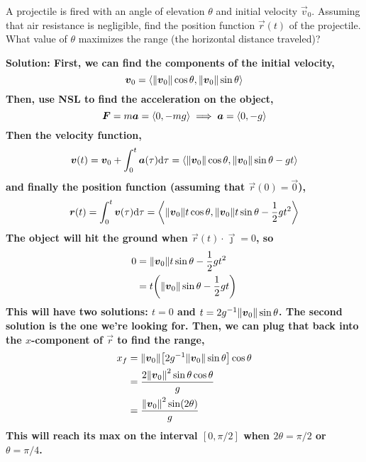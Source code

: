 \begin{example}
    A projectile is fired with an angle of elevation \(\theta\) and initial velocity \(\vec v_0\). Assuming that air resistance is negligible, find the position function \(\vec r(t)\) of the projectile. What value of \(\theta\) maximizes the range (the horizontal distance traveled)?\par\bf{Solution: } First, we can find the components of the initial velocity, \[ \boldsymbol{v}_0 = \left\langle\norm{\boldsymbol{v}_0}\cos \theta, \norm{\boldsymbol{v}_0}\sin \theta \right\rangle \] Then, use NSL to find the acceleration on the object,
    \[ \boldsymbol{F} = m\boldsymbol{a} = \left\langle0, -mg\right\rangle \implies \boldsymbol{a} = \left\langle0, -g\right\rangle \]
    Then the velocity function,
    \[ \boldsymbol{v}(t) = \boldsymbol{v}_0 + \int_0^t\boldsymbol{a}(\tau)\dd \tau = \left\langle \norm{\boldsymbol{v}_0}\cos \theta, \norm{\boldsymbol{v}_0}\sin \theta-gt\right\rangle \]
    and finally the position function (assuming that \(\vec r(0) = \vec 0\)),
    \[ \boldsymbol{r}(t) = \int_0^t\boldsymbol{v}(\tau)\dd \tau = \left\langle\norm{\boldsymbol{v}_0}t\cos\theta, \norm{\boldsymbol{v}_0}t\sin\theta-\frac{1}{2}gt^2 \right\rangle\]
    The object will hit the ground when \(\vec r(t)\cdot \vec \jmath = 0\), so
    \begin{align*}
        0 &= \norm{\vec v_0}t\sin\theta - \frac{1}{2}gt^2 \\
        &= t\pqty{\norm{\vec v_0}\sin \theta - \frac{1}{2}gt}
    \end{align*}
    This will have two solutions: \(t = 0\) and \(t=2g^{-1}\norm{\boldsymbol{v}_0}\sin\theta\). The second solution is the one we're looking for. Then, we can plug that back into the \(x\)-component of \(\vec r\) to find the range,
    \begin{align*}
        x_f &= \norm{\vec v_0}\bqty{2g^{-1}\norm{\vec v_0}\sin\theta}\cos \theta \\
        &= \frac{2\norm{\vec v_0}^2\sin\theta\cos\theta}{g} \\
        &= \frac{\norm{\vec v_0}^2\sin(2\theta)}{g}
    \end{align*}
    This will reach its max on the interval \([0, \pi/2]\) when \(2\theta = \pi/2\) or \(\theta=\pi/4\).
\end{example}
